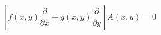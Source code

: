 \begin{equation}%
\left[ f(x,y) \frac{\partial}{\partial x} + g (x,y)
\frac{\partial}{\partial y} \right] A(x,y) = 0
\end{equation}

